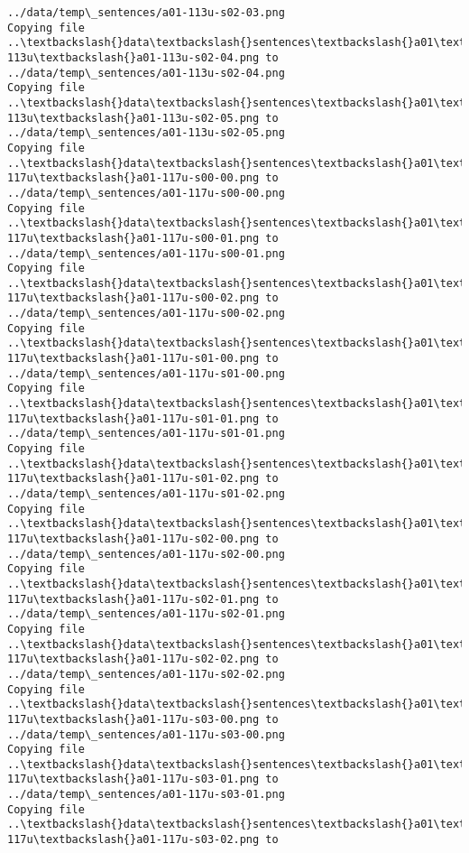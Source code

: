 \documentclass[11pt]{article}
\begin{document}
\begin{Verbatim}[commandchars=\\\{\}]
../data/temp\_sentences/a01-113u-s02-03.png
Copying file ..\textbackslash{}data\textbackslash{}sentences\textbackslash{}a01\textbackslash{}a01-113u\textbackslash{}a01-113u-s02-04.png to
../data/temp\_sentences/a01-113u-s02-04.png
Copying file ..\textbackslash{}data\textbackslash{}sentences\textbackslash{}a01\textbackslash{}a01-113u\textbackslash{}a01-113u-s02-05.png to
../data/temp\_sentences/a01-113u-s02-05.png
Copying file ..\textbackslash{}data\textbackslash{}sentences\textbackslash{}a01\textbackslash{}a01-117u\textbackslash{}a01-117u-s00-00.png to
../data/temp\_sentences/a01-117u-s00-00.png
Copying file ..\textbackslash{}data\textbackslash{}sentences\textbackslash{}a01\textbackslash{}a01-117u\textbackslash{}a01-117u-s00-01.png to
../data/temp\_sentences/a01-117u-s00-01.png
Copying file ..\textbackslash{}data\textbackslash{}sentences\textbackslash{}a01\textbackslash{}a01-117u\textbackslash{}a01-117u-s00-02.png to
../data/temp\_sentences/a01-117u-s00-02.png
Copying file ..\textbackslash{}data\textbackslash{}sentences\textbackslash{}a01\textbackslash{}a01-117u\textbackslash{}a01-117u-s01-00.png to
../data/temp\_sentences/a01-117u-s01-00.png
Copying file ..\textbackslash{}data\textbackslash{}sentences\textbackslash{}a01\textbackslash{}a01-117u\textbackslash{}a01-117u-s01-01.png to
../data/temp\_sentences/a01-117u-s01-01.png
Copying file ..\textbackslash{}data\textbackslash{}sentences\textbackslash{}a01\textbackslash{}a01-117u\textbackslash{}a01-117u-s01-02.png to
../data/temp\_sentences/a01-117u-s01-02.png
Copying file ..\textbackslash{}data\textbackslash{}sentences\textbackslash{}a01\textbackslash{}a01-117u\textbackslash{}a01-117u-s02-00.png to
../data/temp\_sentences/a01-117u-s02-00.png
Copying file ..\textbackslash{}data\textbackslash{}sentences\textbackslash{}a01\textbackslash{}a01-117u\textbackslash{}a01-117u-s02-01.png to
../data/temp\_sentences/a01-117u-s02-01.png
Copying file ..\textbackslash{}data\textbackslash{}sentences\textbackslash{}a01\textbackslash{}a01-117u\textbackslash{}a01-117u-s02-02.png to
../data/temp\_sentences/a01-117u-s02-02.png
Copying file ..\textbackslash{}data\textbackslash{}sentences\textbackslash{}a01\textbackslash{}a01-117u\textbackslash{}a01-117u-s03-00.png to
../data/temp\_sentences/a01-117u-s03-00.png
Copying file ..\textbackslash{}data\textbackslash{}sentences\textbackslash{}a01\textbackslash{}a01-117u\textbackslash{}a01-117u-s03-01.png to
../data/temp\_sentences/a01-117u-s03-01.png
Copying file ..\textbackslash{}data\textbackslash{}sentences\textbackslash{}a01\textbackslash{}a01-117u\textbackslash{}a01-117u-s03-02.png to

\end{Verbatim}
\end{document}
